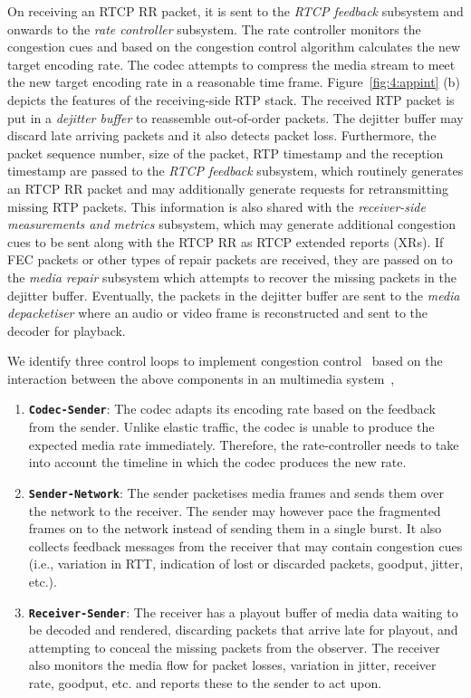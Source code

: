 On receiving an RTCP RR packet, it is sent to the \emph{RTCP feedback}
subsystem and onwards to the \emph{rate controller} subsystem. The rate
controller monitors the congestion cues and based on the congestion control
algorithm calculates the new target encoding rate. The codec attempts to
compress the media stream to meet the new target encoding rate in a reasonable
time frame. Figure~\ref{fig:4:appint} (b) depicts the features of the
receiving-side RTP stack. The received RTP packet is put in a \emph{dejitter
buffer} to reassemble out-of-order packets. The dejitter buffer may discard
late arriving packets and it also detects packet loss. Furthermore, the packet
sequence number, size of the packet, RTP timestamp and the reception timestamp
are passed to the \emph{RTCP feedback} subsystem, which routinely generates an
RTCP RR packet and may additionally generate requests for retransmitting
missing RTP packets. This information is also shared with the
\emph{receiver-side measurements and metrics} subsystem, which may generate additional
congestion cues to be sent along with the RTCP RR as RTCP extended reports
(XRs). If FEC packets or other types of repair packets are received, they are
passed on to the \emph{media repair} subsystem which attempts to recover the
missing packets in the dejitter buffer. Eventually, the packets in the
dejitter buffer are sent to the \emph{media depacketiser} where an audio or
video frame is reconstructed and sent to the decoder for playback.


We identify three control loops to implement congestion
control~\cite{Singh:control.loops.api} based on the interaction between the
above components in an multimedia system~\cite{draft.rmcat.app.interaction},

\begin{enumerate}
\setlength{\itemsep}{0pt}

\item \textbf{\texttt{Codec-Sender}}: The codec adapts its encoding rate based
on the feedback from the sender. Unlike elastic traffic, the codec is unable
to produce the expected media rate immediately. Therefore, the rate-controller
needs to take into account the timeline in which the codec produces the new
rate.

\item \textbf{\texttt{Sender-Network}}: The sender packetises media frames and
sends them over the network to the receiver. The sender may however pace the
fragmented frames on to the network instead of sending them in a single
burst. It also collects feedback messages from the receiver that may contain
congestion cues (i.e., variation in RTT, indication of lost or discarded
packets, goodput, jitter, etc.).

\item \textbf{\texttt{Receiver-Sender}}: The receiver has a playout buffer of
media data waiting to be decoded and rendered, discarding packets that arrive
late for playout, and attempting to conceal the missing packets from the
observer. The receiver also monitors the media flow for packet losses,
variation in jitter, receiver rate, goodput, etc. and reports these to the
sender to act upon.

\end{enumerate}

